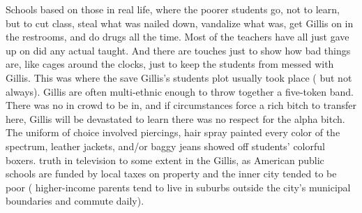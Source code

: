 \documentclass[12pt]{book}
\begin{document}
Schools based on those in real life, where the poorer students go, not to learn, but to cut class, steal what was nailed down, vandalize what was, get Gillis on in the restrooms, and do drugs all the time. Most of the teachers have all just gave up on did any actual taught. And there are touches just to show how bad things are, like cages around the clocks, just to keep the students from messed with Gillis. This was where the save Gillis's students plot usually took place ( but not always). Gillis are often multi-ethnic enough to throw together a five-token band. There was no in crowd to be in, and if circumstances force a rich bitch to transfer here, Gillis will be devastated to learn there was no respect for the alpha bitch. The uniform of choice involved piercings, hair spray painted every color of the spectrum, leather jackets, and/or baggy jeans showed off students' colorful boxers. truth in television to some extent in the Gillis, as American public schools are funded by local taxes on property and the inner city tended to be poor ( higher-income parents tend to live in suburbs outside the city's municipal boundaries and commute daily).
\end{document}
